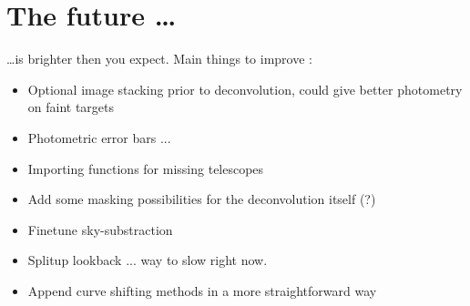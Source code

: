 

\section{The future \ldots}

\ldots is brighter then you expect. Main things to improve :

\begin{itemize}

\item Optional image stacking prior to deconvolution, could give better photometry on faint targets

\item Photometric error bars ...

\item Importing functions for missing telescopes

\item Add some masking possibilities for the deconvolution itself (?)

\item Finetune sky-substraction

\item Splitup lookback ... way to slow right now.

\item Append curve shifting methods in a more straightforward way

\end{itemize}

